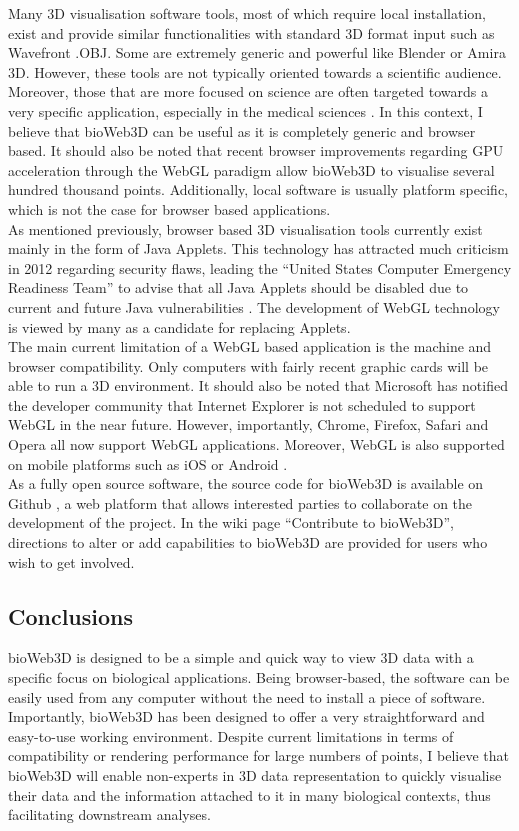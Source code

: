 Many 3D visualisation software tools, most of which require local installation, exist and provide similar functionalities with standard 3D format input such as Wavefront .OBJ. Some are extremely generic and powerful like Blender or Amira 3D. However, these tools are not typically oriented towards a scientific audience. Moreover, those that are more focused on science are often targeted towards a very specific application, especially in the medical sciences \citep{Wang093D}. In this context, I believe that bioWeb3D can be useful as it is completely generic and browser based. It should also be noted that recent browser improvements regarding GPU acceleration through the WebGL paradigm allow bioWeb3D to visualise several hundred thousand points. Additionally, local software is usually platform specific, which is not the case for browser based applications.\\

As mentioned previously, browser based 3D visualisation tools currently exist mainly in the form of Java Applets. This technology has attracted much criticism in 2012 regarding security flaws, leading the ``United States Computer Emergency Readiness Team'' to advise that all Java Applets should be disabled due to current and future Java vulnerabilities \citep{security}. The development of WebGL technology is viewed by many as a candidate for replacing Applets. \\


The main current limitation of a WebGL based application is the machine and browser compatibility. Only computers with fairly recent graphic cards will be able to run a 3D environment. It should also be noted that Microsoft has notified the developer community that Internet Explorer is not scheduled to support WebGL in the near future. However, importantly, Chrome, Firefox, Safari and Opera all now support WebGL applications. Moreover, WebGL is also supported on mobile platforms such as iOS or Android \citep{caniuse}.\\


As a fully open source software, the source code for bioWeb3D is available on Github \citep{github}, a web platform that allows interested parties to collaborate on the development of the project. In the wiki page ``Contribute to bioWeb3D'', directions to alter or add capabilities to bioWeb3D are provided for users who wish to get involved.

	\subsection{Conclusions}
bioWeb3D is designed to be a simple and quick way to view 3D data with a specific focus on biological applications.  Being browser-based, the software can be easily used from any computer without the need to install a piece of software. Importantly, bioWeb3D has been designed to offer a very straightforward and easy-to-use working environment. Despite current limitations in terms of compatibility or rendering performance for large numbers of points, I believe that bioWeb3D will enable non-experts in 3D data representation to quickly visualise their data and the information attached to it in many biological contexts, thus facilitating downstream analyses.


